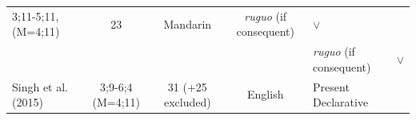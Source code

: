\documentclass[oneside]{report}
\theoremstyle{definition}
\theoremstyle{definition}
\theoremstyle{definition}
\theoremstyle{remark}
\begin{document}
\begin{longtable}[]{@{}lccclc@{}}
\begin{minipage}[t]{0.07\columnwidth}
3;11-5;11, (M=4;11)\strut
\end{minipage} & \begin{minipage}[t]{0.05\columnwidth}\centering\strut
23\strut
\end{minipage} & \begin{minipage}[t]{0.10\columnwidth}\centering\strut
Mandarin\strut
\end{minipage} & \begin{minipage}[t]{0.25\columnwidth}\raggedright\strut
\emph{ruguo} (if consequent)\strut
\end{minipage} & \begin{minipage}[t]{0.13\columnwidth}\centering\strut
\(\lor\)\strut
\end{minipage}\tabularnewline
\begin{minipage}[t]{0.23\columnwidth}\raggedright\strut
\strut
\end{minipage} & \begin{minipage}[t]{0.07\columnwidth}\centering\strut
\strut
\end{minipage} & \begin{minipage}[t]{0.05\columnwidth}\centering\strut
\strut
\end{minipage} & \begin{minipage}[t]{0.10\columnwidth}\centering\strut
\strut
\end{minipage} & \begin{minipage}[t]{0.25\columnwidth}\raggedright\strut
\emph{ruguo} (if consequent)\strut
\end{minipage} & \begin{minipage}[t]{0.13\columnwidth}\centering\strut
\(\lor\)\strut
\end{minipage}\tabularnewline
\begin{minipage}[t]{0.23\columnwidth}\raggedright\strut
Singh et al. (2015)\strut
\end{minipage} & \begin{minipage}[t]{0.07\columnwidth}\centering\strut
3;9-6;4 (M=4;11)\strut
\end{minipage} & \begin{minipage}[t]{0.05\columnwidth}\centering\strut
31 (+25 excluded)\strut
\end{minipage} & \begin{minipage}[t]{0.10\columnwidth}\centering\strut
English\strut
\end{minipage} & \begin{minipage}[t]{0.25\columnwidth}\raggedright\strut
Present Declarative\strut
\end{minipage} & \begin{minipage}[t]{0.13\columnwidth}\centering\strut

\end{minipage}
\end{longtable}
\end{document}
